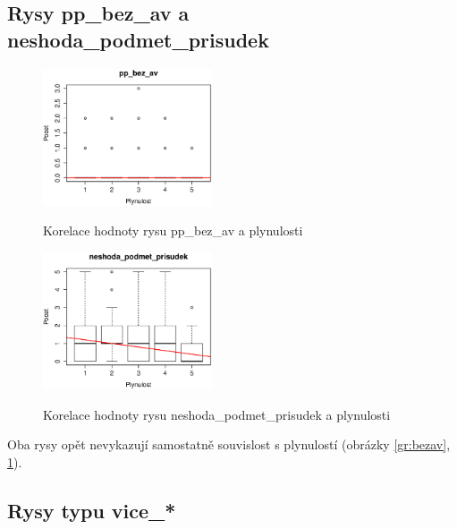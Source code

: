 \documentclass[12pt,a4paper]{report}
\begin{document}
\subsection{Rysy pp\_bez\_av a neshoda\_podmet\_prisudek}
\begin{figure}[!htb]
\begin{center}
  \centering\includegraphics[width=50mm]{./grafy/rysy/pp_bez_av.eps}
  \caption{Korelace hodnoty rysu pp\_bez\_av a plynulosti}\label{gr:bezav}
\endminipage\quad
{}
  \centering\includegraphics[width=50mm]{./grafy/rysy/neshoda_podmet_prisudek.eps}
  \caption{Korelace hodnoty rysu neshoda\_podmet\_prisudek a plynulosti}\label{gr:neshoda}
\endminipage
\end{center}
\end{figure}

Oba rysy opět nevykazují samostatně souvislost s plynulostí (obrázky \ref{gr:bezav}, \ref{gr:neshoda}). 


\subsection{Rysy typu vice\_*}
\end{document}
